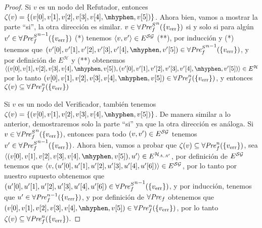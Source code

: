 \begin{proof}
 \sloppy      Si $v$ es un nodo del Refutador, entonces  $\zeta(v) = \{(\pr{0}{v},\pr{1}{v}, \pr{2}{v}, \pr{3}{v}, \pr{4}{v},\mhyphen, \pr{5}{v})\}$. 
        Ahora bien, vamos a mostrar la parte ``si'', la otra dirección es similar. $v \in  {\SymbAFairpre}^n(\{ \ErrorSt \})$ si y solo si para algún $v' \in  {\SymbAFairpre}^{n-1}(\{ \ErrorSt \})$ (*) tenemos 
        $\langle v,v' \rangle \in E^{\SymbG}$ (**),  por inducción y (*) tenemos que 
        $(\pr{0}{v'},\pr{1}{v'}, \pr{2}{v'}, \pr{3}{v'},\pr{4}{v'},\mhyphen, \pr{5}{v'}) \in  {\SymbAFairpre}^{n-1}(\{ \ErrorSt \})$,
        y por definición de $E^{\mathcal{H}}$ y (**) obtenemos 
        $\langle (\pr{0}{v},\pr{1}{v},\pr{2}{v},\pr{3}{v},\pr{4}{v},\mhyphen, \pr{5}{v}),(\pr{0}{v'},\pr{1}{v'},\pr{2}{v'},\pr{3}{v'},\pr{4}{v'},\mhyphen,\pr{5}{v'}) \rangle \in E^{\mathcal{H}}$ por lo tanto $(\pr{0}{v},\pr{1}{v},\pr{2}{v},\pr{3}{v},\pr{4}{v},\mhyphen, \pr{5}{v}) \in \AFairpre^n(\{ \ErrorSt \})$, y entonces $\zeta(v) \subseteq \AFairpre^n(\{ \ErrorSt \})$
        
   
        Si $v$ es un nodo del Verificador, también tenemos  $\zeta(v) = \{( \pr{0}{v},\pr{1}{v},\pr{2}{v},\pr{3}{v},\pr{4}{v},\mhyphen, \pr{5}{v} )\}$.  
        De manera similar a lo anterior, demostraremos solo la parte ``si'' ya que la otra dirección es análoga.       
        Si $v \in  {\SymbAFairpre}^n(\{ \ErrorSt \})$, entonces 
        para todo $(v,v') \in E^{\SymbG}$ tenemos $v' \in  {\SymbAFairpre}^{n-1}(\{ \ErrorSt \})$.  Ahora bien, vamos a probar que $\zeta(v) \subseteq  \AFairpre^n(\{ \ErrorSt \})$, 
        sea $\langle ( \pr{0}{v},\pr{1}{v},\pr{2}{v},\pr{3}{v},\pr{4}{v},\mhyphen, \pr{5}{v} ),u' \rangle \in E^{\mathcal{H}_{A,A'}}$, por definición de $E^{\SymbG}$
        tenemos que $\langle v,  (\pr{0}{u'},  \pr{1}{u'}, \pr{2}{u'}, \pr{3}{u'}, \pr{4}{u'}, \pr{6}{u'}) \rangle \in E^{\SymbG}$, por lo tanto por nuestro supuesto obtenemos que 
        $(\pr{0}{u'},  \pr{1}{u'}, \pr{2}{u'}, \pr{3}{u'}, \pr{4}{u'}, \pr{6}{u'}) \in  {\SymbAFairpre}^{n-1}(\{ \ErrorSt \})$, y por inducción, tenemos que
        $u' \in  \AFairpre^{n-1}(\{ \ErrorSt \})$,  y por definición de $\AFairpre$ obtenemos que 
        $( \pr{0}{v},\pr{1}{v},\pr{2}{v},\pr{3}{v},\pr{4}{v},\mhyphen, \pr{5}{v} ) \in \AFairpre^n(\{ \ErrorSt \})$, por lo tanto $\zeta(v) \subseteq  \AFairpre^n(\{ \ErrorSt \})$.
       

\end{proof}
